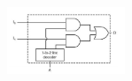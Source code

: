 \documentclass[20pt, a4paper]{article}
\begin{document}
\begin{figure}[htbp]\centering
	\centerline{\includegraphics[width=100pt]{img/lastest/mux2to1Circuit.jpg}}
\end{figure}
\newpage







\end{document}
